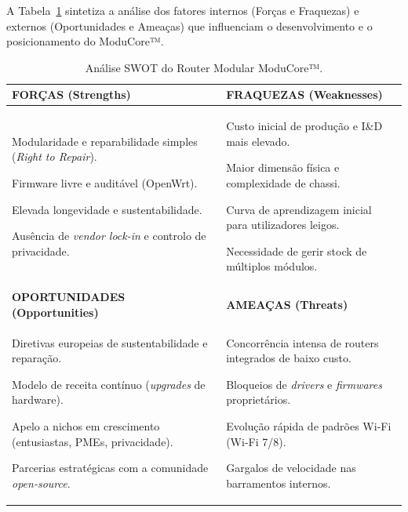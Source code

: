\documentclass[11pt, a4paper]{article}
\begin{document}
A Tabela~\ref{tab:swot} sintetiza a análise dos fatores internos (Forças e Fraquezas) e externos (Oportunidades e Ameaças) que influenciam o desenvolvimento e o posicionamento do ModuCore™.

\begin{table}[h!]
\centering
\small
\renewcommand{\arraystretch}{1.4}
\begin{tabularx}{\textwidth}{>{\raggedright\arraybackslash}X | >{\raggedright\arraybackslash}X}
\toprule
\rowcolor{headerbg}
\textbf{\color{brandblue} FORÇAS (Strengths)} & \textbf{\color{brandblue} FRAQUEZAS (Weaknesses)} \\
\midrule
\textbullet{} Modularidade e reparabilidade simples (\textit{Right to Repair}). \par
\textbullet{} Firmware livre e auditável (OpenWrt). \par
\textbullet{} Elevada longevidade e sustentabilidade. \par
\textbullet{} Ausência de \textit{vendor lock-in} e controlo de privacidade. &
\textbullet{} Custo inicial de produção e I\&D mais elevado. \par
\textbullet{} Maior dimensão física e complexidade de chassi. \par
\textbullet{} Curva de aprendizagem inicial para utilizadores leigos. \par
\textbullet{} Necessidade de gerir stock de múltiplos módulos. \\
\midrule
\rowcolor{headerbg}
\textbf{\color{brandblue} OPORTUNIDADES (Opportunities)} & \textbf{\color{brandblue} AMEAÇAS (Threats)} \\
\midrule
\textbullet{} Diretivas europeias de sustentabilidade e reparação. \par
\textbullet{} Modelo de receita contínuo (\textit{upgrades} de hardware). \par
\textbullet{} Apelo a nichos em crescimento (entusiastas, PMEs, privacidade). \par
\textbullet{} Parcerias estratégicas com a comunidade \textit{open-source}. &
\textbullet{} Concorrência intensa de routers integrados de baixo custo. \par
\textbullet{} Bloqueios de \textit{drivers} e \textit{firmwares} proprietários. \par
\textbullet{} Evolução rápida de padrões Wi-Fi (Wi-Fi 7/8). \par
\textbullet{} Gargalos de velocidade nas barramentos internos. \\
\bottomrule
\end{tabularx}
\caption{Análise SWOT do Router Modular ModuCore™.}
\label{tab:swot}
\end{table}
\end{document}
